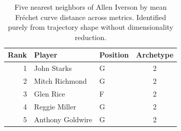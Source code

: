 \begin{table}[htbp]
  \centering\small
  \begin{tabular}{rllc}
    \toprule
    Rank & Player & Position & Archetype \\
    \midrule
    1 & John Starks & G & 2 \\
    2 & Mitch Richmond & G & 2 \\
    3 & Glen Rice & F & 2 \\
    4 & Reggie Miller & G & 2 \\
    5 & Anthony Goldwire & G & 2 \\
    \bottomrule
  \end{tabular}
  \caption{Five nearest neighbors of Allen Iverson by mean Fr\'{e}chet curve distance across metrics. Identified purely from trajectory shape without dimensionality reduction.}
  \label{tab:Allen_Iverson_frechet_curve_neighbors}
\end{table}

